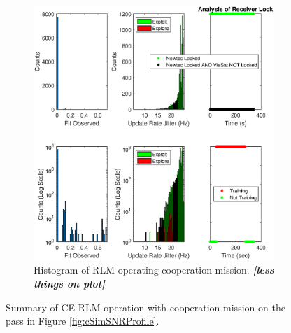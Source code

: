 \begin{figure}[ht!]
\begin{subfigure}{\linewidth}
	\includegraphics[scale=0.5]{figures/c_sim_results/sim22_RLM_hists_coop.eps}
	\caption{Histogram of RLM operating cooperation mission. \textit{\textbf{[less things on plot]}}}
	\label{fig:cSimLMHists}
\end{subfigure}
\caption{Summary of CE-RLM operation with cooperation mission on the pass in Figure \ref{fig:cSimSNRProfile}.}
\label{fig:c22RLMCoop}
\end{figure}
